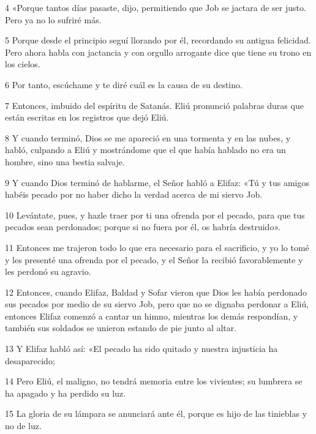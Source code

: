 \par 4 «Porque tantos días pasaste, dijo, permitiendo que Job se jactara de ser justo. Pero ya no lo sufriré más.

\par 5 Porque desde el principio seguí llorando por él, recordando su antigua felicidad. Pero ahora habla con jactancia y con orgullo arrogante dice que tiene su trono en los cielos.

\par 6 Por tanto, escúchame y te diré cuál es la causa de su destino.

\par 7 Entonces, imbuido del espíritu de Satanás. Eliú pronunció palabras duras que están escritas en los registros que dejó Eliú.

\par 8 Y cuando terminó, Dios se me apareció en una tormenta y en las nubes, y habló, culpando a Eliú y mostrándome que el que había hablado no era un hombre, sino una bestia salvaje.

\par 9 Y cuando Dios terminó de hablarme, el Señor habló a Elifaz: «Tú y tus amigos habéis pecado por no haber dicho la verdad acerca de mi siervo Job.

\par 10 Levántate, pues, y hazle traer por ti una ofrenda por el pecado, para que tus pecados sean perdonados; porque si no fuera por él, os habría destruido».

\par 11 Entonces me trajeron todo lo que era necesario para el sacrificio, y yo lo tomé y les presenté una ofrenda por el pecado, y el Señor la recibió favorablemente y les perdonó su agravio.

\par 12 Entonces, cuando Elifaz, Baldad y Sofar vieron que Dios les había perdonado sus pecados por medio de su siervo Job, pero que no se dignaba perdonar a Eliú, entonces Elifaz comenzó a cantar un himno, mientras los demás respondían, y también sus soldados se unieron estando de pie junto al altar.

\par 13 Y Elifaz habló así: «El pecado ha sido quitado y nuestra injusticia ha desaparecido;

\par 14 Pero Eliú, el maligno, no tendrá memoria entre los vivientes; su lumbrera se ha apagado y ha perdido su luz.

\par 15 La gloria de su lámpara se anunciará ante él, porque es hijo de las tinieblas y no de luz.

